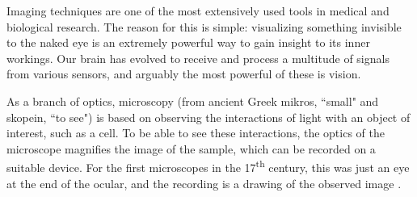 













% 


Imaging techniques
are one of the most extensively used tools in medical and biological research. The reason for this is simple: visualizing something invisible to the naked eye is an extremely powerful way to gain insight to its inner workings. Our brain has evolved to receive and process a multitude of signals from various sensors, and arguably the most powerful of these is vision.

As a branch of optics, microscopy (from ancient Greek mikros, ``small" and skopein, ``to see") is based on observing the interactions of light with an object of interest, such as a cell. To be able to see these interactions, the optics of the microscope magnifies the image of the sample, which can be recorded on a suitable device. For the first microscopes in the 17\textsuperscript{th} century, this was just an eye at the end of the ocular, and the recording is a drawing of the observed image \cite{hooke_micrographia:_1665}.

